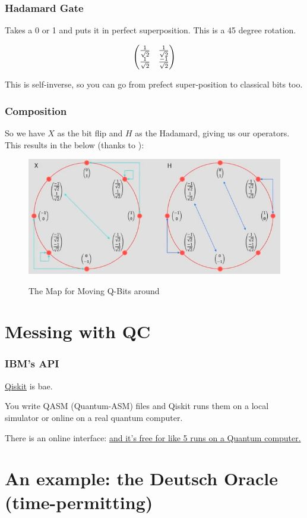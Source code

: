 \documentclass{beamer}
\begin{document}
\begin{frame}
\frametitle{Hadamard Gate}
Takes a 0 or 1 and puts it in perfect
superposition. This is a 45 degree
rotation.

\[
    \begin{pmatrix}
    {1 \over \sqrt{2}} & {1 \over \sqrt{2}}\\
    {1 \over \sqrt{2}} & {-1 \over \sqrt{2}}
    \end{pmatrix}
\]

This is self-inverse, so you can go from
prefect super-position to classical bits too.
\end{frame}

\begin{frame}
\frametitle{Composition}
So we have $X$ as the bit flip and
$H$ as the Hadamard, giving us our operators. This results in the below (thanks to \cite{img-blog}):
\begin{figure}
    \centering
    \includegraphics[width=.75\linewidth]{qt-unit-circle.jpg}
    \label{fig:qt-unit-circle}
    \caption{The Map for Moving Q-Bits around}
\end{figure}
\end{frame}

\section{Messing with QC}

\begin{frame}
\frametitle{IBM's API}
\href{https://qiskit.org/}{Qiskit} is bae.

You write QASM (Quantum-ASM) files and Qiskit runs them on a local simulator or online on a real quantum computer.

There is an online interface: \href{https://quantumexperience.ng.bluemix.net/qx/editor}{and it's free for like 5 runs on a Quantum computer.}
\end{frame}

\section{An example: the Deutsch Oracle (time-permitting)}
\end{document}
